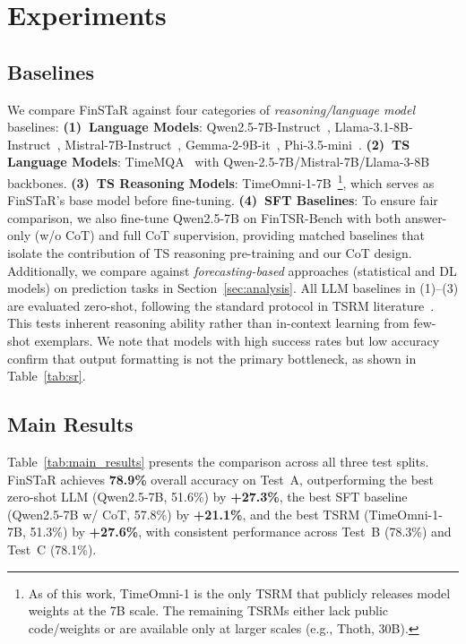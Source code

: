 \section{Experiments}
\label{sec:experiments}

\subsection{Baselines}
We compare FinSTaR against four categories of \textit{reasoning/language model} baselines:
\textbf{(1)~Language Models}: Qwen2.5-7B-Instruct~\cite{qwen2025qwen25}, Llama-3.1-8B-Instruct~\cite{llama31}, Mistral-7B-Instruct~\cite{mistral7b}, Gemma-2-9B-it~\cite{gemma2}, Phi-3.5-mini~\cite{phi35}.
\textbf{(2)~TS Language Models}: TimeMQA~\cite{timemqa2025} with Qwen-2.5-7B/Mistral-7B/Llama-3-8B backbones.
\textbf{(3)~TS Reasoning Models}: TimeOmni-1-7B~\cite{timeomni1}\footnote{As of this work, TimeOmni-1 is the only TSRM that publicly releases model weights at the 7B scale. The remaining TSRMs either lack public code/weights or are available only at larger scales (e.g., Thoth, 30B).}, which serves as FinSTaR's base model before fine-tuning.
\textbf{(4)~SFT Baselines}: To ensure fair comparison, we also fine-tune Qwen2.5-7B on FinTSR-Bench with both answer-only (w/o CoT) and full CoT supervision, providing matched baselines that isolate the contribution of TS reasoning pre-training and our CoT design.
Additionally, we compare against \textit{forecasting-based} approaches (statistical and DL models) on prediction tasks in Section~\ref{sec:analysis}.
All LLM baselines in (1)--(3) are evaluated zero-shot, following the standard protocol in TSRM literature~\cite{timeomni1, merrill2024towards}. This tests inherent reasoning ability rather than in-context learning from few-shot exemplars. We note that models with high success rates but low accuracy
confirm that output formatting is not the primary bottleneck, as shown in Table~\ref{tab:sr}.

\subsection{Main Results}
Table~\ref{tab:main_results} presents the comparison across all three test splits.
FinSTaR achieves \textbf{78.9\%} overall accuracy on Test~A, outperforming the best zero-shot LLM (Qwen2.5-7B, 51.6\%) by \textbf{+27.3\%}, the best SFT baseline (Qwen2.5-7B w/ CoT, 57.8\%) by \textbf{+21.1\%}, and the best TSRM (TimeOmni-1-7B, 51.3\%) by \textbf{+27.6\%}, with consistent performance across Test~B (78.3\%) and Test~C (78.1\%).


